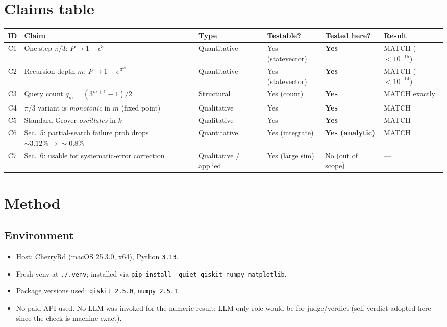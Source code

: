 \documentclass[11pt]{article}
\begin{document}
\section{Claims table}

\begin{tabular}{clllll}
\toprule
ID & Claim & Type & Testable? & Tested here? & Result \\
\midrule
C1 & One-step $\pi/3$: $P \to 1-\epsilon^3$ & Quantitative & Yes (statevector) & \textbf{Yes} & MATCH ($<10^{-15}$) \\
C2 & Recursion depth $m$: $P \to 1-\epsilon^{\,3^{m}}$ & Quantitative & Yes (statevector) & \textbf{Yes} & MATCH ($<10^{-14}$) \\
C3 & Query count $q_m = (3^{m+1}-1)/2$ & Structural & Yes (count) & \textbf{Yes} & MATCH exactly \\
C4 & $\pi/3$ variant is \emph{monotonic} in $m$ (fixed point) & Qualitative & Yes & \textbf{Yes} & MATCH \\
C5 & Standard Grover \emph{oscillates} in $k$ & Qualitative & Yes & \textbf{Yes} & MATCH \\
C6 & Sec.\ 5: partial-search failure prob drops $\sim 3.12\% \to \sim 0.8\%$ & Quantitative & Yes (integrate) & \textbf{Yes (analytic)} & MATCH \\
C7 & Sec.\ 6: usable for systematic-error correction & Qualitative / applied & Yes (large sim) & No (out of scope) & --- \\
\bottomrule
\end{tabular}

\section{Method}

\subsection{Environment}

\begin{itemize}
  \item Host: CherryRd (macOS 25.3.0, x64), Python \texttt{3.13}.
  \item Fresh venv at \texttt{./.venv}; installed via
        \texttt{pip install --quiet qiskit numpy matplotlib}.
  \item Package versions used: \texttt{qiskit 2.5.0}, \texttt{numpy 2.5.1}.
  \item No paid API used. No LLM was invoked for the numeric result;
        LLM-only role would be for judge/verdict (self-verdict adopted
        here since the check is machine-exact).
\end{itemize}
\end{document}
